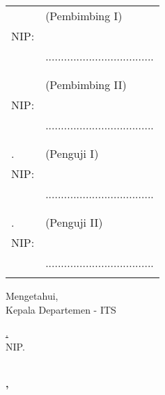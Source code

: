 \noindent
\begin{tabularx}{\textwidth}{X l}
  \advisor{}               & (Pembimbing I)                      \\
  NIP: \advisornip{}       &                                     \\
                           & ................................... \\
                           &                                     \\
                           &                                     \\
  \coadvisor{}             & (Pembimbing II)                     \\
  NIP: \coadvisornip{}     &                                     \\
                           & ................................... \\
                           &                                     \\
                           &                                     \\
  \examinerone{}.          & (Penguji I)                         \\
  NIP: \examineronenip{}   &                                     \\
                           & ................................... \\
                           &                                     \\
                           &                                     \\
  \examinertwo{}.          & (Penguji II)                        \\
  NIP: \examinertwonip{}   &                                     \\
                           & ................................... \\
                           &                                     \\
\end{tabularx}
\endgroup

\begin{center}
  Mengetahui, \\
  Kepala Departemen \department{} \facultyshort{} - ITS\\

  \vspace{8ex}

  \underline{\headofdepartment{}.} \\
  NIP. \headofdepartmentnip{}
\end{center}

\begin{center}
  \textbf{\MakeUppercase{\place{}}\\\MONTH{}, \the\year{}}
\end{center}
\endgroup
